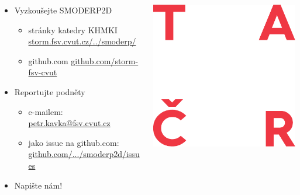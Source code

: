 \begin{frame}[plain]
    \begin{columns}
        \begin{column}{0.5\textwidth}
            \begin{itemize}
                \item Vyzkoušejte SMODERP2D
                \begin{itemize}
                    \item stránky katedry KHMKI \href{http://storm.fsv.cvut.cz/cinnost-katedry/volne-stazitelne-vysledky/smoderp/?lang=cz}{storm.fsv.cvut.cz/../smoderp/}
                    \item github.com \href{https://github.com/storm-fsv-cvut/smoderp2d}{github.com/storm-fsv-cvut}
                \end{itemize}
                \item Reportujte podněty
                \begin{itemize}
                    \item e-mailem: \href{mailto:petr.kavka@fsv.cvut.cz}{petr.kavka@fsv.cvut.cz} 
                    \item jako issue na github.com: \href{https://github.com/storm-fsv-cvut/smoderp2d/issues}{github.com/.../smoderp2d/issues}
                \end{itemize}
                \item Napište nám!
            \end{itemize}
        \end{column}
        \begin{column}{0.5\textwidth}
            \hfill\includegraphics[height=0.15\textheight]{loga/logo_TACR_zakl.png}\\\vspace{0.5em}

\end{column}
\end{columns}
\end{frame}

